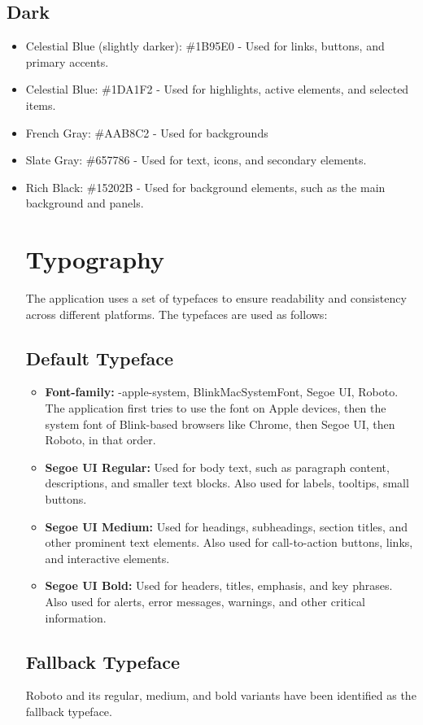 \documentclass{article}
\begin{document}
\subsection{Dark}
\begin{itemize}
    \item Celestial Blue (slightly darker): \#1B95E0 - Used for links, buttons, and primary accents.
    \item Celestial Blue: \#1DA1F2 - Used for highlights, active elements, and selected items.
    \item French Gray: \#AAB8C2 - Used for backgrounds
    \item Slate Gray: \#657786 - Used for text, icons, and secondary elements.
    \item Rich Black: \#15202B - Used for background elements, such as the main background and panels.

\section{Typography}
    The application uses a set of typefaces to ensure readability and consistency across different platforms. The typefaces are used as follows:
    
\subsection{Default Typeface}
\begin{itemize}
    \item \textbf{Font-family:} -apple-system, BlinkMacSystemFont, Segoe UI, Roboto. The application first tries to use the font on Apple devices, then the system font of Blink-based browsers like Chrome, then Segoe UI, then Roboto, in that order.
    \item \textbf{Segoe UI Regular:} Used for body text, such as paragraph content, descriptions, and smaller text blocks. Also used for labels, tooltips, small buttons.
    \item \textbf{Segoe UI Medium:} Used for headings, subheadings, section titles, and other prominent text elements. Also used for call-to-action buttons, links, and interactive elements.
    \item \textbf{Segoe UI Bold:} Used for headers, titles, emphasis, and key phrases. Also used for alerts, error messages, warnings, and other critical information.
\end{itemize}
    
\subsection{Fallback Typeface}
    Roboto and its regular, medium, and bold variants have been identified as the fallback typeface.

\end{itemize}
\end{document}
